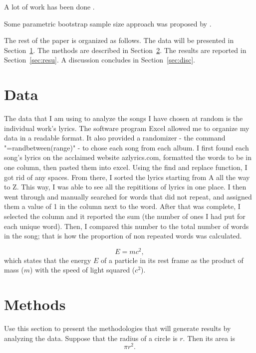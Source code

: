 \documentclass[12pt]{article}
\begin{document}
A lot of work has been done \citep[e.g.,][]{xie2015dynamic}.

Some parametric bootstrap sample size approach was proposed by
\citet{dwivedi2017analysis}. 


The rest of the paper is organized as follows.
The data will be presented in Section~\ref{sec:data}.
The methods are described in Section~\ref{sec:meth}.
The results are reported in Section~\ref{sec:resu}.
A discussion concludes in Section~\ref{sec:disc}.


\section{Data}
\label{sec:data}

The data that I am using to analyze the songs I have chosen at random is the individual work's lyrics. The software program Excel allowed me to organize my data in a readable format. It also provided a randomizer - the command "=randbetween(range)" - to chose each song from each album. I first found each song's lyrics on the acclaimed website azlyrics.com, formatted the words to be in one column, then pasted them into excel. Using the find and replace function, I got rid of any spaces. From there, I sorted the lyrics starting from A all the way to Z. This way, I was able to see all the repititions of lyrics in one place. I then went through and manually searched for words that did not repeat, and assigned them a value of 1 in the column next to the word. After that was complete, I selected the column and it reported the sum (the number of ones I had put for each unique word). Then, I compared this number to the total number of words in the song; that is how the proportion of non repeated words was calculated.

\begin{equation}
  \label{eq:mc2}
  E = m c^2,
\end{equation}
which states that the energy $E$ of a particle in its rest frame as the product
of mass ($m$) with the speed of light squared ($c^2$).


\section{Methods}
\label{sec:meth}

Use this section to present the methodologies that will generate results by
analyzing the data. Suppose that the radius of a circle is $r$. Then its area is
\begin{equation}
  \label{eq:area}
  \pi r^2.
\end{equation}
\end{document}
